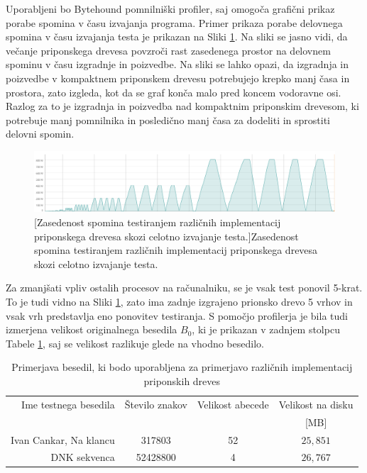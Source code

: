 Uporabljeni bo Bytehound \cite{Bytehound2024} pomnilniški profiler, saj omogoča grafični prikaz porabe spomina v času izvajanja programa. Primer prikaza porabe delovnega spomina v času izvajanja testa je prikazan na Sliki \ref{fig:ZasedonestRAM}. Na sliki se jasno vidi, da večanje priponskega drevesa povzroči rast zasedenega prostor na delovnem spominu v času izgradnje in poizvedbe. Na sliki se lahko opazi, da izgradnja in poizvedbe v kompaktnem priponskem drevesu potrebujejo krepko manj časa in prostora, zato izgleda, kot da se graf konča malo pred koncem vodoravne osi. Razlog za to je izgradnja in poizvedba nad kompaktnim priponskim drevesom, ki potrebuje manj pomnilnika in posledično manj časa za dodeliti in sprostiti delovni spomin.

\begin{figure}[tb]
    \begin{center}
        \includegraphics[width=\textwidth]{Slike/bytehoundGraf.png}    
        [Zasedenost spomina testiranjem različnih implementacij priponskega drevesa skozi celotno izvajanje testa.]{Zasedenost spomina testiranjem različnih implementacij priponskega drevesa skozi celotno izvajanje testa.} 
        \label{fig:ZasedonestRAM}    
    \end{center}
\end{figure}


Za zmanjšati vpliv ostalih procesov na računalniku, se je vsak test ponovil 5-krat. To je tudi vidno na Sliki \ref{fig:ZasedonestRAM}, zato ima zadnje izgrajeno prionsko drevo 5 vrhov in vsak vrh predstavlja eno ponovitev testiranja. S pomočjo profilerja je bila tudi izmerjena velikost originalnega besedila $B_0$, ki je prikazan v zadnjem stolpcu Tabele \ref{tab:besedila}, saj se velikost razlikuje glede na vhodno besedilo.

\begin{table}[htb]
    \caption{Primerjava besedil, ki bodo uporabljena za primerjavo različnih implementacij priponskih dreves}
    \label{tab:besedila}
    \centering
    \begin{tabular}{rccc}
        Ime testnega besedila& Število znakov & Velikost abecede & Velikost na disku \\
        &  &   & [MB]\\
         \hline
        Ivan Cankar, Na klancu \cite{podatkiNaKlancu}& 317803 & 52 & $25,851$ \\
        DNK sekvenca \cite{podatki}&  52428800& 4 & $26,767$ \\
    \end{tabular}
    
\end{table}

